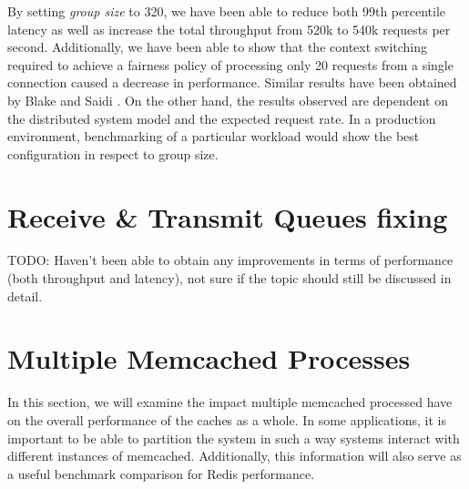 By setting \textit{group size} to 320, we have been able to reduce both 99th percentile latency as well as increase the total throughput from 520k to 540k requests per second. Additionally, we have been able to show that the context switching required to achieve a fairness policy of processing only 20 requests from a single connection caused a decrease in performance. Similar results have been obtained by Blake and Saidi \cite{blake54does}. On the other hand, the results observed are dependent on the distributed system model and the expected request rate. In a production environment, benchmarking of a particular workload would show the best configuration in respect to group size.

\section{Receive \& Transmit Queues fixing}
TODO: Haven't been able to obtain any improvements in terms of performance (both throughput and latency), not sure if the topic should still be discussed in detail.


\section{Multiple Memcached Processes}

In this section, we will examine the impact multiple memcached processed have on the overall performance of the caches as a whole. In some applications, it is important to be able to partition the system in such a way systems interact with different instances of memcached. Additionally, this information will also serve as a useful benchmark comparison for Redis performance.